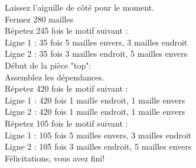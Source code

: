 \documentclass{article}
\begin{document}
Laissez l'aiguille de côté pour le moment.\\
Fermez 280 mailles\\

Répetez 245 fois le motif suivant :\\
Ligne 1 : 35 fois 5 mailles envers, 3 mailles endroit\\
Ligne 2 : 35 fois 3 mailles endroit, 5 mailles envers\\


Début de la pièce "top":\\
Assemblez les dépendances.\\

Répetez 420 fois le motif suivant :\\
Ligne 1 : 420 fois 1 maille endroit, 1 maille envers\\
Ligne 2 : 420 fois 1 maille endroit, 1 maille envers\\


Répetez 105 fois le motif suivant :\\
Ligne 1 : 105 fois 5 mailles envers, 3 mailles endroit\\
Ligne 2 : 105 fois 3 mailles endroit, 5 mailles envers\\


Félicitations, vous avez fini!
\end{document}
